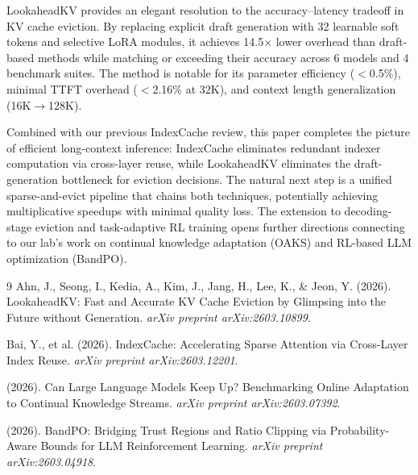 \documentclass[11pt]{article}
\begin{document}
LookaheadKV provides an elegant resolution to the accuracy--latency tradeoff in KV cache eviction.
By replacing explicit draft generation with 32 learnable soft tokens and selective LoRA modules, it achieves 14.5$\times$ lower overhead than draft-based methods while matching or exceeding their accuracy across 6 models and 4 benchmark suites.
The method is notable for its parameter efficiency ($<$0.5\%), minimal TTFT overhead ($<$2.16\% at 32K), and context length generalization (16K$\rightarrow$128K).

Combined with our previous IndexCache review, this paper completes the picture of efficient long-context inference: IndexCache eliminates redundant indexer computation via cross-layer reuse, while LookaheadKV eliminates the draft-generation bottleneck for eviction decisions.
The natural next step is a unified sparse-and-evict pipeline that chains both techniques, potentially achieving multiplicative speedups with minimal quality loss.
The extension to decoding-stage eviction and task-adaptive RL training opens further directions connecting to our lab's work on continual knowledge adaptation (OAKS) and RL-based LLM optimization (BandPO).

\begin{thebibliography}{9}
 Ahn, J., Seong, I., Kedia, A., Kim, J., Jang, H., Lee, K., \& Jeon, Y. (2026). LookaheadKV: Fast and Accurate KV Cache Eviction by Glimpsing into the Future without Generation. \textit{arXiv preprint arXiv:2603.10899}.

 Bai, Y., et al. (2026). IndexCache: Accelerating Sparse Attention via Cross-Layer Index Reuse. \textit{arXiv preprint arXiv:2603.12201}.

 (2026). Can Large Language Models Keep Up? Benchmarking Online Adaptation to Continual Knowledge Streams. \textit{arXiv preprint arXiv:2603.07392}.

 (2026). BandPO: Bridging Trust Regions and Ratio Clipping via Probability-Aware Bounds for LLM Reinforcement Learning. \textit{arXiv preprint arXiv:2603.04918}.
\end{thebibliography}
\end{document}
